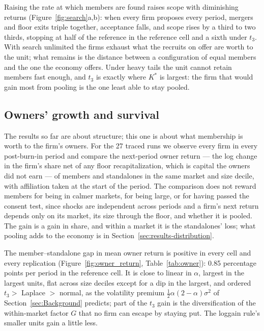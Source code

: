 

Raising the rate at which members are found raises scope with diminishing returns (Figure~\ref{fig:search}a,b): when every firm proposes every period, mergers and floor exits triple together, acceptance falls, and scope rises by a third to two thirds, stopping at half of the reference in the reference cell and a sixth under $t_3$. With search unlimited the firms exhaust what the recruits on offer are worth to the unit; what remains is the distance between a configuration of equal members and the one the economy offers. Under heavy tails the unit cannot retain members fast enough, and $t_3$ is exactly where $K^*$ is largest: the firm that would gain most from pooling is the one least able to stay pooled.

\subsection{Owners' growth and survival}\label{sec:results-owners}

The results so far are about structure; this one is about what membership is worth to the firm's owners. For the 27 traced runs we observe every firm in every post-burn-in period and compare the next-period owner return --- the log change in the firm's share net of any floor recapitalization, which is capital the owners did not earn --- of members and standalones in the same market and size decile, with affiliation taken at the start of the period. The comparison does not reward members for being in calmer markets, for being large, or for having passed the consent test, since shocks are independent across periods and a firm's next return depends only on its market, its size through the floor, and whether it is pooled. The gain is a gain in share, and within a market it is the standalones' loss; what pooling adds to the economy is in Section~\ref{sec:results-distribution}.

The member--standalone gap in mean owner return is positive in every cell and every replication (Figure~\ref{fig:owner_return}, Table~\ref{tab:owner}): 0.85 percentage points per period in the reference cell. It is close to linear in $\alpha$, largest in the largest units, flat across size deciles except for a dip in the largest, and ordered $t_3 >$ Laplace $>$ normal, as the volatility premium $\tfrac12\alpha(2-\alpha)\sigma^2$ of Section~\ref{sec:Background} predicts; part of the $t_3$ gain is the diversification of the within-market factor $G$ that no firm can escape by staying put. The loggain rule's smaller units gain a little less.

